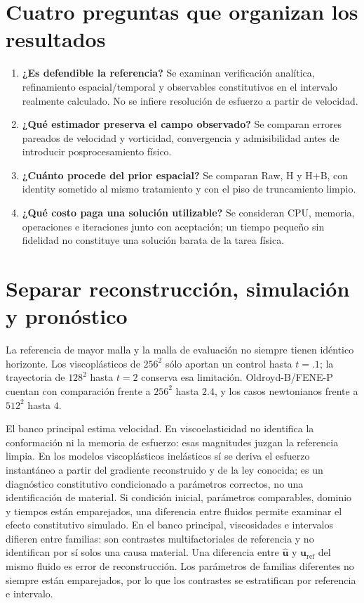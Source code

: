 \documentclass[11pt,oneside,openany]{book}
\newcommand{\uref}{\boldsymbol u_{\mathrm{ref}}}
\newcommand{\uhat}{\widehat{\boldsymbol u}}
\begin{document}
\section{Cuatro preguntas que organizan los resultados}
\begin{enumerate}
\item \textbf{¿Es defendible la referencia?} Se examinan verificación analítica,
refinamiento espacial/temporal y observables constitutivos en el intervalo
realmente calculado. No se infiere resolución de esfuerzo a partir de velocidad.
\item \textbf{¿Qué estimador preserva el campo observado?} Se comparan errores
pareados de velocidad y vorticidad, convergencia y admisibilidad antes de
introducir posprocesamiento físico.
\item \textbf{¿Cuánto procede del prior espacial?} Se comparan Raw, H y H+B,
con identity sometido al mismo tratamiento y con el piso de truncamiento limpio.
\item \textbf{¿Qué costo paga una solución utilizable?} Se consideran CPU,
memoria, operaciones e iteraciones junto con aceptación; un tiempo pequeño
sin fidelidad no constituye una solución barata de la tarea física.
\end{enumerate}

\section{Separar reconstrucción, simulación y pronóstico}
La referencia de mayor malla y la malla de evaluación no siempre tienen
idéntico horizonte. Los viscoplásticos de $256^2$ sólo aportan un control
hasta $t=.1$; la trayectoria de $128^2$ hasta $t=2$ conserva esa limitación.
Oldroyd-B/FENE-P cuentan con comparación frente a $256^2$ hasta $2.4$,
y los casos newtonianos frente a $512^2$ hasta $4$.

El banco principal estima velocidad. En viscoelasticidad no identifica la
conformación ni la memoria de esfuerzo: esas magnitudes juzgan la referencia
limpia. En los modelos viscoplásticos inelásticos sí se deriva el esfuerzo
instantáneo a partir del gradiente reconstruido y de la ley conocida; es un
diagnóstico constitutivo condicionado a parámetros correctos, no una
identificación de material. Si condición inicial, parámetros comparables,
dominio y tiempos están emparejados, una diferencia entre fluidos permite
examinar el efecto constitutivo simulado. En el banco principal, viscosidades
e intervalos difieren entre familias: son contrastes multifactoriales de
referencia y no identifican por sí solos una causa material. Una
diferencia entre $\uhat$ y $\uref$ del mismo fluido es error de reconstrucción.
Los parámetros de familias diferentes no siempre están emparejados, por lo
que los contrastes se estratifican por referencia e intervalo.
\end{document}
